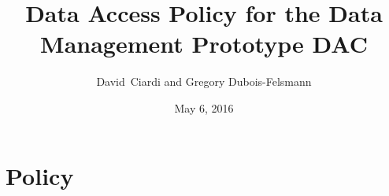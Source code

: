 \documentclass[DM,lsstdraft,toc]{lsstdoc}
\title[Data Access Policy for PDAC]{Data Access Policy for the Data Management Prototype DAC}
\author{David~Ciardi and Gregory Dubois-Felsmann}
\date{May 6, 2016}
\begin{document}
\maketitle

\section{Policy}
\end{document}
